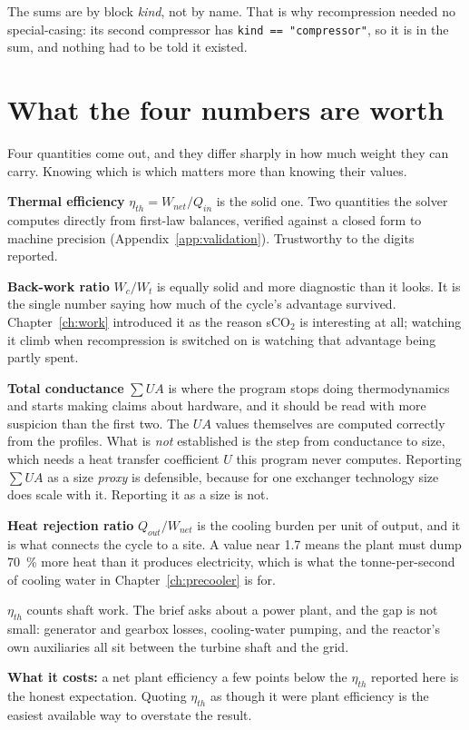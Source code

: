 \documentclass[11pt,a4paper]{report}
\newcommand{\code}[1]{\texttt{\small #1}}
\begin{document}

\noindent The sums are by block \emph{kind}, not by name. That is why
recompression needed no special-casing: its second compressor has
\code{kind == "compressor"}, so it is in the sum, and nothing had to be told
it existed.

\section{What the four numbers are worth}
\label{sec:metrics}

Four quantities come out, and they differ sharply in how much weight they
can carry. Knowing which is which matters more than knowing their values.

\textbf{Thermal efficiency} $\eta_{th} = W_{net}/Q_{in}$ is the solid one.
Two quantities the solver computes directly from first-law balances,
verified against a closed form to machine precision
(Appendix~\ref{app:validation}). Trustworthy to the digits reported.

\textbf{Back-work ratio} $W_c/W_t$ is equally solid and more diagnostic than
it looks. It is the single number saying how much of the cycle's advantage
survived. Chapter~\ref{ch:work} introduced it as the reason sCO$_2$ is
interesting at all; watching it climb when recompression is switched on is
watching that advantage being partly spent.

\textbf{Total conductance} $\sum UA$ is where the program stops doing
thermodynamics and starts making claims about hardware, and it should be
read with more suspicion than the first two. The $UA$ values themselves are
computed correctly from the profiles. What is \emph{not} established is the
step from conductance to size, which needs a heat transfer coefficient $U$
this program never computes. Reporting $\sum UA$ as a size \emph{proxy} is
defensible, because for one exchanger technology size does scale with it.
Reporting it as a size is not.

\textbf{Heat rejection ratio} $Q_{out}/W_{net}$ is the cooling burden per
unit of output, and it is what connects the cycle to a site. A value near
\num{1.7} means the plant must dump \SI{70}{\percent} more heat than it
produces electricity, which is what the tonne-per-second of cooling water in
Chapter~\ref{ch:precooler} is for.

\begin{caveat}[title={Caveat: this is thermal efficiency, not plant efficiency}]
$\eta_{th}$ counts shaft work. The brief asks about a power plant, and the
gap is not small: generator and gearbox losses, cooling-water pumping, and
the reactor's own auxiliaries all sit between the turbine shaft and the
grid.

\textbf{What it costs:} a net plant efficiency a few points below the
$\eta_{th}$ reported here is the honest expectation. Quoting $\eta_{th}$ as
though it were plant efficiency is the easiest available way to overstate
the result.
\end{caveat}
\end{document}
